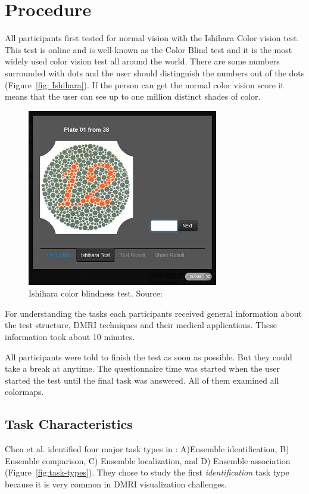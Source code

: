 \documentclass[a4paper, 12pt]{report}
\begin{document}
\section{Procedure}
All participants first tested for normal vision with the Ishihara Color vision test. This test is online and is well-known as the Color Blind test and it is the most widely used color vision test all around the world. There are some numbers surrounded with dots and the user should distinguish the numbers out of the dots (Figure~\ref{fig: Ishihara}). If the person can get the normal color vision score it means that the user can see up to one million distinct shades of color.
\begin{figure}[ht]
    \centering
    \includegraphics[width = 0.6\columnwidth]{Ishihara}
    \caption{Ishihara color blindness test. Source:  \cite{www.color-blindness.com}}
    \label{fig:Ishihara}
\end{figure}

For understanding the tasks each participants received general information about the test structure, DMRI techniques and their medical applications. These information took about 10 minutes. 

All participants were told to finish the test as soon as possible. But they could take a break at anytime. The questionnaire time was started when the user started the test until the final task was answered. 
All of them examined all colormaps.

\subsection{Task Characteristics}

Chen et al. identified four major task types in \cite{chen}: A)Ensemble identification, B) Ensemble comparison, C) Ensemble localization, and D) Ensemble association (Figure~\ref{fig:task-types}). They chose to study the first \emph{identification} task type because it is very common in DMRI visualization challenges. 
\end{document}
